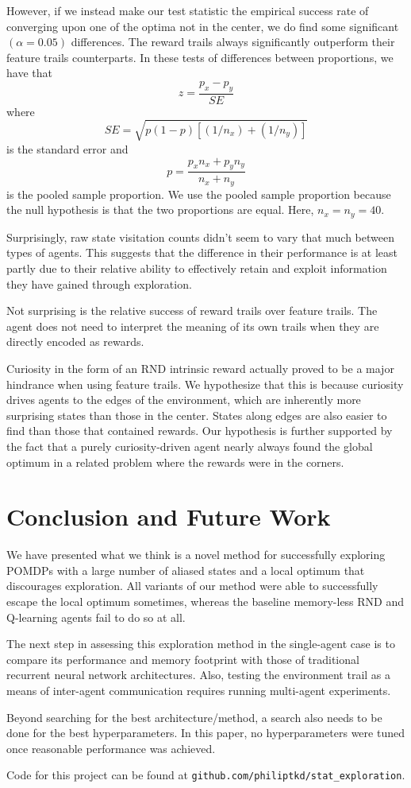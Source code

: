 \documentclass[12pt,journal,compsoc]{IEEEtran}
\begin{document}
	However, if we instead make our test statistic the empirical success rate of converging upon one of the optima not in the center, we do find some significant $(\alpha = 0.05)$ differences. The reward trails always significantly outperform their feature trails counterparts. In these tests of differences between proportions, we have that 
	\[z = \frac{p_x - p_y}{SE}\]
	where
	\[SE = \sqrt{p(1-p)[(1/n_x)+(1/n_y)]}\]
	is the standard error and
	\[p = \frac{p_xn_x+p_yn_y}{n_x+n_y}\]
	is the pooled sample proportion. We use the pooled sample proportion because the null hypothesis is that the two proportions are equal. Here, $n_x=n_y=40$.
	
	Surprisingly, raw state visitation counts didn't seem to vary that much between types of agents. This suggests that the difference in their performance is at least partly due to their relative ability to effectively retain and exploit information they have gained through exploration.
	
	Not surprising is the relative success of reward trails over feature trails. The agent does not need to interpret the meaning of its own trails when they are directly encoded as rewards.
	
	Curiosity in the form of an RND intrinsic reward actually proved to be a major hindrance when using feature trails. We hypothesize that this is because curiosity drives agents to the edges of the environment, which are inherently more surprising states than those in the center. States along edges are also easier to find than those that contained rewards. Our hypothesis is further supported by the fact that a purely curiosity-driven agent nearly always found the global optimum in a related problem where the rewards were in the corners.
	
	\section{Conclusion and Future Work}
	We have presented what we think is a novel method for successfully exploring POMDPs with a large number of aliased states and a local optimum that discourages exploration. All variants of our method were able to successfully escape the local optimum sometimes, whereas the baseline memory-less RND and Q-learning agents fail to do so at all.
	
	The next step in assessing this exploration method in the single-agent case is to compare its performance and memory footprint with those of traditional recurrent neural network architectures. Also, testing the environment trail as a means of inter-agent communication requires running multi-agent experiments.
	
	Beyond searching for the best architecture/method, a search also needs to be done for the best hyperparameters. In this paper, no hyperparameters were tuned once reasonable performance was achieved.  
	
	Code for this project can be found at \texttt{github.com/philiptkd/stat\_exploration}.
	
	{}
		
	
\end{document}

